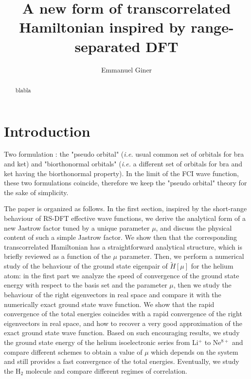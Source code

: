 \documentclass[aip,jcp,reprint,noshowkeys,superscriptaddress]{revtex4-1}
\begin{document}
	

\title{A new form of transcorrelated Hamiltonian inspired by range-separated DFT}

\author{Emmanuel Giner}

\begin{abstract}
blabla

\end{abstract}

\maketitle
\section{Introduction}
Two formulation : the "pseudo orbital" (\textit{i.e.} usual common set of orbitals for bra and ket) and "biorthonormal orbitals" (\textit{i.e.} a different set of orbitals for bra and ket having the biorthonormal property). 
In the limit of the FCI wave function, these two formulations coincide, therefore we keep the "pseudo orbital" theory for the sake of simplicity. 

The paper is organized as follows. 
In the first section, inspired by the short-range behaviour of RS-DFT effective wave functions,  
we derive the analytical form of a new Jastrow factor tuned by a unique parameter $\mu$, and discuss the physical content of such a simple Jastrow factor. 
We show then that the corresponding transcorrelated Hamiltonian has a straightforward analytical structure, which is briefly reviewed as a function of the $\mu$ parameter. 
Then, we perform a numerical study of the behaviour of the ground state eigenpair of $\tilde{H}[\mu]$ for the helium atom: 
in the first part we analyze the speed of convergence of the ground state energy with respect to the basis set and the parameter $\mu$, 
then we study the behaviour of the right eigenvectors in real space and compare it with the numerically exact ground state wave function. 
We show that the rapid convergence of the total energies coincides with a rapid convergence of the right eigenvectors in real space, and how to recover a very good approximation of the exact ground state wave function. 
Based on such encouraging results, we study the ground state energy of the helium isoelectronic series from Li$^+$ to Ne$^{8+}$ and compare different schemes to obtain 
a value of $\mu$ which depends on the system and still provides a fast convergence of the total energies. 
Eventually, we study the H$_2$ molecule and compare different regimes of correlation. 
\end{document}
